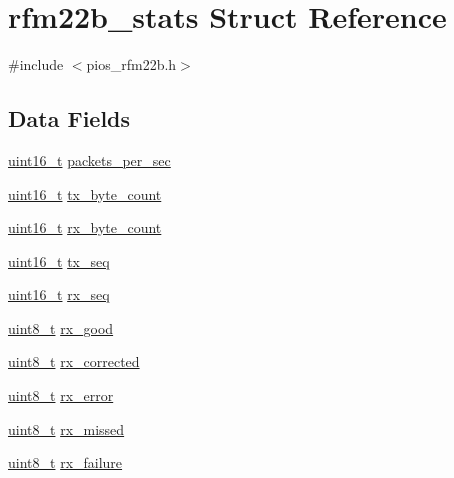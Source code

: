 \hypertarget{structrfm22b__stats}{\section{rfm22b\-\_\-stats Struct Reference}
\label{structrfm22b__stats}
}


{\ttfamily \#include $<$pios\-\_\-rfm22b.\-h$>$}

\subsection*{Data Fields}
\begin{DoxyCompactItemize}
\item 
\hyperlink{stdint_8h_a273cf69d639a59973b6019625df33e30}{uint16\-\_\-t} \hyperlink{structrfm22b__stats_a9ed3bba20847dcee3b0397c210b22d3d}{packets\-\_\-per\-\_\-sec}
\item 
\hyperlink{stdint_8h_a273cf69d639a59973b6019625df33e30}{uint16\-\_\-t} \hyperlink{structrfm22b__stats_a3f3b0ee5d6c3557da05b35b54102da71}{tx\-\_\-byte\-\_\-count}
\item 
\hyperlink{stdint_8h_a273cf69d639a59973b6019625df33e30}{uint16\-\_\-t} \hyperlink{structrfm22b__stats_a4a173cf22afe7f957dc268d65ab1833c}{rx\-\_\-byte\-\_\-count}
\item 
\hyperlink{stdint_8h_a273cf69d639a59973b6019625df33e30}{uint16\-\_\-t} \hyperlink{structrfm22b__stats_a8279ef420f8e1d3c6773b8cb528f5122}{tx\-\_\-seq}
\item 
\hyperlink{stdint_8h_a273cf69d639a59973b6019625df33e30}{uint16\-\_\-t} \hyperlink{structrfm22b__stats_ad73defbcdc26cc6438d0f28723a909e7}{rx\-\_\-seq}
\item 
\hyperlink{stdint_8h_aba7bc1797add20fe3efdf37ced1182c5}{uint8\-\_\-t} \hyperlink{structrfm22b__stats_aa9b17c04f89e42496f776f7cac5b549d}{rx\-\_\-good}
\item 
\hyperlink{stdint_8h_aba7bc1797add20fe3efdf37ced1182c5}{uint8\-\_\-t} \hyperlink{structrfm22b__stats_aff132143dc1206acab2aa0972429aaba}{rx\-\_\-corrected}
\item 
\hyperlink{stdint_8h_aba7bc1797add20fe3efdf37ced1182c5}{uint8\-\_\-t} \hyperlink{structrfm22b__stats_aa732f9f0055fff25329e07f6b4cce221}{rx\-\_\-error}
\item 
\hyperlink{stdint_8h_aba7bc1797add20fe3efdf37ced1182c5}{uint8\-\_\-t} \hyperlink{structrfm22b__stats_a10156bfde7480e15c39ba077da5f687f}{rx\-\_\-missed}
\item 
\hyperlink{stdint_8h_aba7bc1797add20fe3efdf37ced1182c5}{uint8\-\_\-t} \hyperlink{structrfm22b__stats_a4acb04b442511cd543677d8d8e7b4a81}{rx\-\_\-failure}

\end{DoxyCompactItemize}
